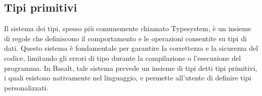 \subsection{Tipi primitivi}
Il sistema dei tipi, spesso più comunemente chiamato Typesystem, è un insieme di regole che definiscono il comportamento e 
le operazioni consentite su tipi di dati. Questo sistema è fondamentale per garantire la correttezza e la sicurezza del 
codice, limitando gli errori di tipo durante la compilazione o l'esecuzione del programma. In Basalt, tale sistema prevede un 
insieme di tipi detti tipi primitivi, i quali esistono nativamente nel linguaggio, e permette all’utente di definire tipi personalizzati.


 \newpage
 \newpage
 \newpage
 \newpage
 \newpage
